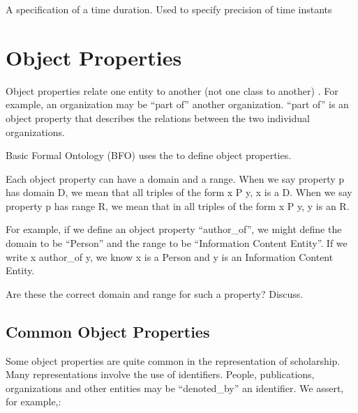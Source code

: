 \documentclass[letterpaper,10pt,english]{sphinxmanual}
\begin{document}
\begin{sphinxShadowBox}

\sphinxAtStartPar
A specification of a time duration.  Used to specify precision of time instants
\end{sphinxShadowBox}

\begin{sphinxShadowBox}

\sphinxAtStartPar
{}
\end{sphinxShadowBox}


\chapter{Object Properties}
\label{\detokenize{object-properties:object-properties}}\label{\detokenize{object-properties::doc}}
\sphinxAtStartPar
Object properties relate one entity to another (not one class to another) .
For example, an organization may be
“part of” another organization.  “part of” is an object property that describes the
relations between the two individual organizations.

\sphinxAtStartPar
Basic Formal Ontology (BFO) uses the
 to define object
properties.

\sphinxAtStartPar
Each object property can have a domain and a range.  When we say property p has domain D,
we mean that all triples of the form x P y, x is a D.  When we say property p has range R,
we mean that in all triples of the form x P y, y is an R.

\sphinxAtStartPar
For example, if we define an object property “author\_of”, we might define the domain to
be “Person” and the range to be “Information Content Entity”. If we write x author\_of y,
we know x is a Person and y is an Information Content Entity. %
\begin{footnote}[1]\sphinxAtStartFootnote
Are these the correct domain and range for such a property? Discuss.
%
\end{footnote}


\section{Common Object Properties}
\label{\detokenize{object-properties:common-object-properties}}
\sphinxAtStartPar
Some object properties are quite common in the representation of scholarship.  Many
representations involve the use of identifiers.  People, publications, organizations
and other entities may be “denoted\_by” an identifier.  We assert, for example,:
\end{document}
